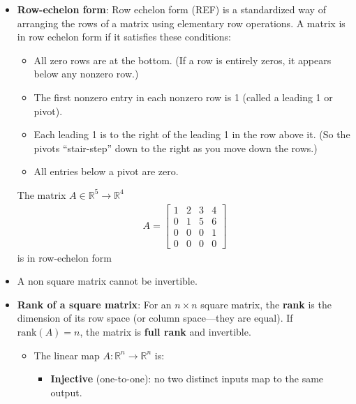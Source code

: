 \documentclass{report}
\begin{document}
\begin{itemize}
    \end{itemize}

    \pagebreak 
    \begin{itemize}
        \item \textbf{Row-echelon form}:
            Row echelon form (REF) is a standardized way of arranging the rows of a matrix using elementary row operations. A matrix is in row echelon form if it satisfies these conditions:
            \begin{itemize}
                \item All zero rows are at the bottom. (If a row is entirely zeros, it appears below any nonzero row.)
                \item The first nonzero entry in each nonzero row is 1 (called a leading 1 or pivot).
                \item Each leading 1 is to the right of the leading 1 in the row above it. (So the pivots “stair-step” down to the right as you move down the rows.)
                \item All entries below a pivot are zero.
            \end{itemize}
            The matrix $A \in \mathbb{R}^{5} \to \mathbb{R}^{4}$
            \begin{align*}
                A = \begin{bmatrix}
                    1 & 2 & 3 & 4 \\
                    0 & 1 & 5 & 6 \\
                    0 & 0 & 0 & 1 \\
                    0 & 0 & 0 & 0
                \end{bmatrix}
            \end{align*}
            is in row-echelon form
        \item A non square matrix cannot be invertible.
        \item \textbf{Rank of a square matrix}:  For an $n \times n$ square matrix, the \textbf{rank} is the dimension of its row space (or column space---they are equal).
            \bigbreak \noindent 
            If $\text{rank}(A) = n$, the matrix is \textbf{full rank} and invertible.
            \begin{itemize}
                \item The linear map $A: \mathbb{R}^n \to \mathbb{R}^n$ is:
                    \begin{itemize}
                        \item \textbf{Injective} (one-to-one): no two distinct inputs map to the same output.

\end{itemize}
\end{itemize}
\end{itemize}
\end{document}
